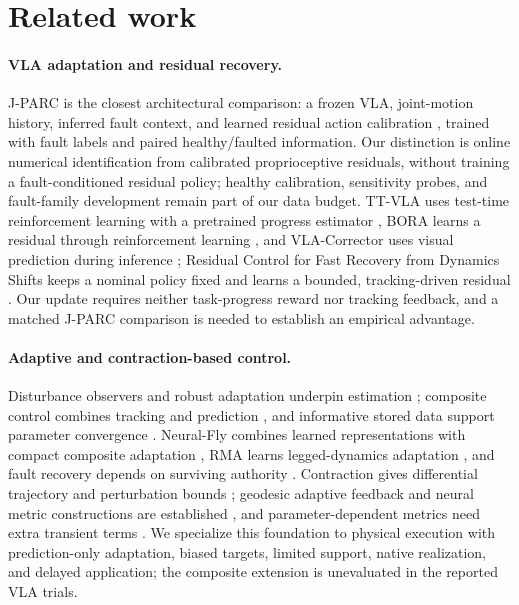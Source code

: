 \section{Related work}
\label{sec:related}
\paragraph{VLA adaptation and residual recovery.}
J-PARC is the closest architectural comparison: a frozen VLA, joint-motion
history, inferred fault context, and learned residual action calibration
\citep{jparc2026}, trained with fault labels and paired healthy/faulted
information. Our distinction is online numerical identification from
calibrated proprioceptive residuals, without training a fault-conditioned
residual policy; healthy calibration, sensitivity probes, and fault-family
development remain part of our data budget. TT-VLA uses test-time
reinforcement learning with a pretrained progress estimator
\citep{ttvla2026}, BORA learns a residual through reinforcement learning
\citep{bora2026}, and VLA-Corrector uses visual prediction during inference
\citep{vlacorrector2026}; Residual Control for Fast Recovery from Dynamics
Shifts keeps a nominal policy fixed and learns a bounded, tracking-driven
residual \citep{jayasinghe2026residual}. Our update requires neither
task-progress reward nor tracking feedback, and a matched J-PARC comparison
is needed to establish an empirical advantage.

\paragraph{Adaptive and contraction-based control.}
Disturbance observers and robust adaptation underpin estimation
\citep{chen2016dob,ioannou1996}; composite control combines tracking and
prediction \citep{slotine1989composite}, and informative stored data support
parameter convergence \citep{chowdhary2010concurrent,parikh2019integral}.
Neural-Fly combines learned representations with compact composite adaptation
\citep{oconnell2022neuralfly}, RMA learns legged-dynamics adaptation
\citep{rma2021}, and fault recovery depends on surviving authority
\citep{tao2001actuator}. Contraction gives differential trajectory and
perturbation bounds \citep{lohmiller1998,tsukamoto2021tutorial}; geodesic
adaptive feedback and neural metric constructions are established
\citep{lopez2020adaptivecontraction,tsukamoto2021adaptivecontraction}, and
parameter-dependent metrics need extra transient terms
\citep{gessow2023adaptive}. We specialize this foundation to physical
execution with prediction-only adaptation, biased targets, limited support,
native realization, and delayed application; the composite extension is
unevaluated in the reported VLA trials.
